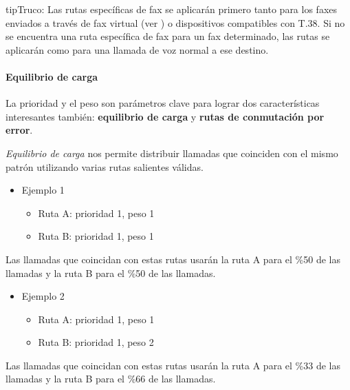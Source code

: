 \documentclass[letterpaper,10pt,spanish]{sphinxmanual}
\begin{document}
\begin{notice}{tip}{Truco:}
Las rutas específicas de fax se aplicarán primero tanto para los faxes enviados a través de fax virtual (ver {\hyperref[administration_portal/client/vpbx/faxes:faxes]{}}) o dispositivos compatibles con T.38. Si no se encuentra una ruta específica de fax para un fax determinado, las rutas se aplicarán como para una llamada de voz normal a ese destino.
\end{notice}


\paragraph{Equilibrio de carga}
\label{administration_portal/brand/routing/outgoing_routings:load-balancing}
La prioridad y el peso son parámetros clave para lograr dos características interesantes también: \textbf{equilibrio de carga} y \textbf{rutas de conmutación por error}.

\emph{Equilibrio de carga} nos permite distribuir llamadas que coinciden con el mismo patrón utilizando varias rutas salientes válidas.
\begin{itemize}
\item {} 
Ejemplo 1
\begin{itemize}
\item {} 
Ruta A: prioridad 1, peso 1

\item {} 
Ruta B: prioridad 1, peso 1

\end{itemize}

\end{itemize}

Las llamadas que coincidan con estas rutas usarán la ruta A para el \%50 de las llamadas y la ruta B para el \%50 de las llamadas.
\begin{itemize}
\item {} 
Ejemplo 2
\begin{itemize}
\item {} 
Ruta A: prioridad 1, peso 1

\item {} 
Ruta B: prioridad 1, peso 2

\end{itemize}

\end{itemize}

Las llamadas que coincidan con estas rutas usarán la ruta A para el \%33 de las llamadas y la ruta B para el \%66 de las llamadas.
\end{document}
